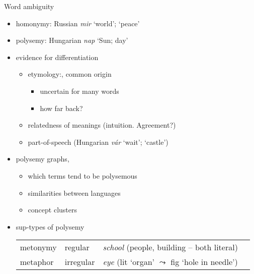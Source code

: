 \documentclass[10pt]{beamer}%
\begin{document}
\begin{frame}{Word ambiguity}
  \begin{itemize}
    \item homonymy: Russian \emph{mir} `world'; `peace'
    \item polysemy: Hungarian \emph{nap} `Sun; day'
    \item evidence for differentiation
      \begin{itemize}
        \item etymology:, common origin
          \begin{itemize}
            \item uncertain for many words
            \item how far back?
          \end{itemize}
        \item relatedness of meanings (intuition. Agreement?)
        \item part-of-speech (Hungarian \emph{vár} `wait'; `castle')
      \end{itemize}
    \item polysemy graphs, 
      \begin{itemize}
        \item which terms tend to be polysemous
        \item similarities between languages  \cite{Youn:2016}
        \item concept clusters
      \end{itemize}
    \item sup-types of polysemy
      \begin{tabular}{llll}
        \toprule
        metonymy & regular    & \emph{school} (people, building -- both
        literal) \\
        metaphor & irregular  & \emph{eye} 
        (lit `organ' $\leadsto$ fig `hole in needle') \\
        \bottomrule
      \end{tabular}
  \end{itemize}
\end{frame}
\end{document}
